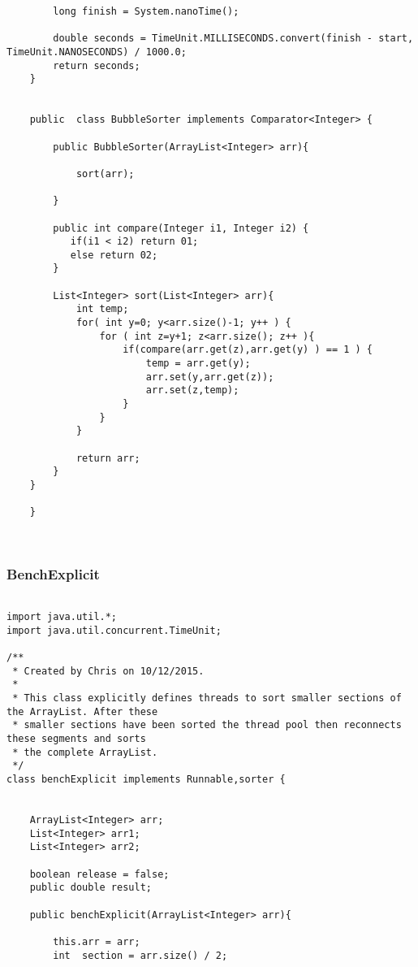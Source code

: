 \documentclass[11pt]{article}  %
\theoremstyle{definition}
\theoremstyle{remark}
\begin{document}
\begin{appendices}
\begin{lstlisting}
        long finish = System.nanoTime();

        double seconds = TimeUnit.MILLISECONDS.convert(finish - start, TimeUnit.NANOSECONDS) / 1000.0;
        return seconds;
    }


    public  class BubbleSorter implements Comparator<Integer> {

        public BubbleSorter(ArrayList<Integer> arr){

            sort(arr);

        }

        public int compare(Integer i1, Integer i2) {
           if(i1 < i2) return 01;
           else return 02;
        }

        List<Integer> sort(List<Integer> arr){
            int temp;
            for( int y=0; y<arr.size()-1; y++ ) {
                for ( int z=y+1; z<arr.size(); z++ ){
                    if(compare(arr.get(z),arr.get(y) ) == 1 ) {
                        temp = arr.get(y);
                        arr.set(y,arr.get(z));
                        arr.set(z,temp);
                    }
                }
            }

            return arr;
        }
    }

    }



\end{lstlisting}

\newpage
\subsubsection{BenchExplicit}\label{1} 
  \begin{lstlisting}

import java.util.*;
import java.util.concurrent.TimeUnit;

/**
 * Created by Chris on 10/12/2015.
 *
 * This class explicitly defines threads to sort smaller sections of the ArrayList. After these
 * smaller sections have been sorted the thread pool then reconnects these segments and sorts
 * the complete ArrayList.
 */
class benchExplicit implements Runnable,sorter {


    ArrayList<Integer> arr;
    List<Integer> arr1;
    List<Integer> arr2;

    boolean release = false;
    public double result;

    public benchExplicit(ArrayList<Integer> arr){

        this.arr = arr;
        int  section = arr.size() / 2;


\end{lstlisting}
\end{appendices}
\end{document}
